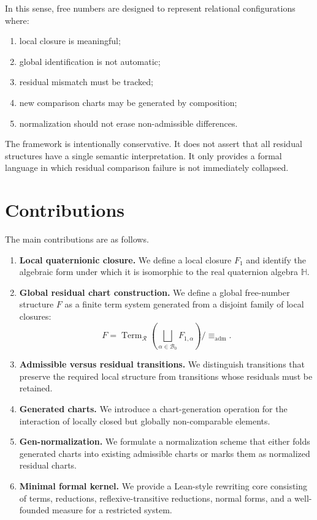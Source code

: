 \documentclass[11pt]{article}
\begin{document}
In this sense, free numbers are designed to represent relational configurations where:
\begin{enumerate}
  \item local closure is meaningful;
  \item global identification is not automatic;
  \item residual mismatch must be tracked;
  \item new comparison charts may be generated by composition;
  \item normalization should not erase non-admissible differences.
\end{enumerate}

The framework is intentionally conservative. It does not assert that all residual structures have a single semantic interpretation. It only provides a formal language in which residual comparison failure is not immediately collapsed.

\section{Contributions}

The main contributions are as follows.
\begin{enumerate}
  \item \textbf{Local quaternionic closure.} We define a local closure $F_1$ and identify the algebraic form under which it is isomorphic to the real quaternion algebra $\mathbb H$.
  \item \textbf{Global residual chart construction.} We define a global free-number structure $F$ as a finite term system generated from a disjoint family of local closures:
  \[
  F = \operatorname{Term}_{\mathcal R}\left(\bigsqcup_{\alpha\in\mathcal B_0}F_{1,\alpha}\right)/\equiv_{\mathrm{adm}}.
  \]
  \item \textbf{Admissible versus residual transitions.} We distinguish transitions that preserve the required local structure from transitions whose residuals must be retained.
  \item \textbf{Generated charts.} We introduce a chart-generation operation for the interaction of locally closed but globally non-comparable elements.
  \item \textbf{Gen-normalization.} We formulate a normalization scheme that either folds generated charts into existing admissible charts or marks them as normalized residual charts.
  \item \textbf{Minimal formal kernel.} We provide a Lean-style rewriting core consisting of terms, reductions, reflexive-transitive reductions, normal forms, and a well-founded measure for a restricted system.
\end{enumerate}
\end{document}
